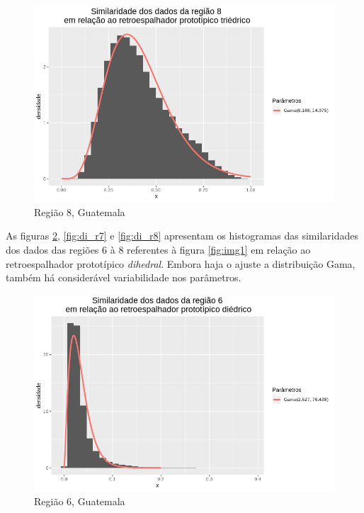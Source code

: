 \documentclass[12pt]{article}
\begin{document}
\begin{figure}[!h]
    \centering    
    \vspace{0.15\linewidth}
    \includegraphics[width = 0.95\linewidth]{../../Images/Report_18_12_17/tri_region8.png}
    \caption{Região 8, Guatemala}
    \label{fig:tri_r8}
\end{figure}

As figuras \ref{fig:di_r6}, \ref{fig:di_r7} e \ref{fig:di_r8} apresentam os histogramas das similaridades dos dados das regiões 6 à 8 referentes à figura \ref{fig:img1} em relação ao retroespalhador prototípico \textit{dihedral}. Embora haja o ajuste a distribuição Gama, também há considerável variabilidade nos parâmetros.

\begin{figure}[!h]
    \centering
    \includegraphics[width = 0.95\linewidth]{../../Images/Report_18_12_17/di_region6.png}
    \caption{Região 6, Guatemala}
    \label{fig:di_r6}
\end{figure}
\end{document}
